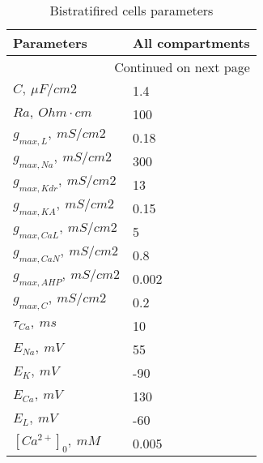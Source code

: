 \begin{longtable}{ll}
\caption{Bistratifired cells parameters}\label{ca1_bis_cell_parameters}\\
\toprule
                                        Parameters & All compartments \\
\midrule
\endhead
\midrule
\multicolumn{2}{r}{{Continued on next page}} \\
\midrule
\endfoot

\bottomrule
\endlastfoot
$C,\ \mu F/cm2$ &    1.4 \\
$Ra,\ Ohm \cdot cm$ & 100 \\
$g_{max, L},\ mS/cm2 $ & 0.18 \\
$g_{max, Na}, \ mS/cm2$ &              300 \\
$g_{max, Kdr},\ mS/cm2$ &               13 \\
$g_{max, KA},\ mS/cm2$ &             0.15 \\
$g_{max, CaL},\ mS/cm2$   &                5 \\
$g_{max, CaN},\ mS/cm2$   &              0.8 \\
$g_{max, AHP},\ mS/cm2$   &            0.002 \\
$g_{max, C},\ mS/cm2$  &              0.2 \\
$\tau_{Ca},\ ms$  &               10 \\
$E_{Na}, \ mV $&               55 \\
$E_K, \ mV$ &              -90 \\
$E_{Ca}, \ mV$ &              130 \\
$E_L, \ mV$ &              -60 \\
$[Ca^{2+}]_0, \ mM$ &                0.005 \\
\end{longtable}

